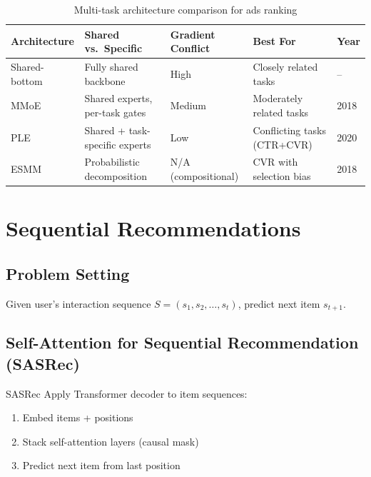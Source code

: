 \begin{table}[H]
\centering
\caption{Multi-task architecture comparison for ads ranking}
\begin{tabularx}{\textwidth}{lXXXl}
\toprule
\textbf{Architecture} & \textbf{Shared vs.\ Specific} & \textbf{Gradient Conflict} & \textbf{Best For} & \textbf{Year} \\
\midrule
Shared-bottom & Fully shared backbone & High & Closely related tasks & -- \\
MMoE & Shared experts, per-task gates & Medium & Moderately related tasks & 2018 \\
PLE & Shared + task-specific experts & Low & Conflicting tasks (CTR+CVR) & 2020 \\
ESMM & Probabilistic decomposition & N/A (compositional) & CVR with selection bias & 2018 \\
\bottomrule
\end{tabularx}
\end{table}

\section{Sequential Recommendations}
\label{sec:sequential_recsys}

\subsection{Problem Setting}

Given user's interaction sequence $S = (s_1, s_2, \ldots, s_t)$, predict next item $s_{t+1}$.

\subsection{Self-Attention for Sequential Recommendation (SASRec)}

\begin{mathresult}{SASRec}
Apply Transformer decoder to item sequences:
\begin{enumerate}
    \item Embed items + positions
    \item Stack self-attention layers (causal mask)
    \item Predict next item from last position
\end{enumerate}
\end{mathresult}

